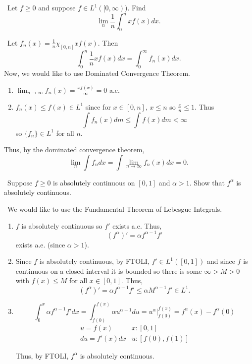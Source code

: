 \documentclass[12pt]{Homework}
\begin{document}
\begin{problem} $\,$
Let $f\ge0$ and suppose $f\in L^1([0,\infty))$. Find $$\lim_n\frac{1}{n}\int_0^nxf(x)dx.$$
\end{problem}


\begin{solution}$\,$
Let $f_n(x)=\frac{1}{n}\chi_{[0,n]}xf(x).$ Then $$\int_0^n\frac{1}{n}xf(x)dx=\int_0^\infty f_n(x)dx.$$
Now, we would like to use Dominated Convergence Theorem. 
\begin{enumerate}
    \item $\displaystyle\lim_{n\to\infty}f_n(x)=\frac{xf(x)}{\infty}=0$ a.e.
    \item $f_n(x)\le f(x)\in L^1$ since for $x\in[0,n]$, $x\le n$ so $\frac{x}{n}\le 1$. Thus $$\int f_n(x)dm\le\int f(x)dm<\infty$$ so $\{f_n\}\in L^1$ for all $n$.
\end{enumerate}

Thus, by the dominated convergence theorem, $$\lim_n\int f_ndx=\int\lim_{n\to\infty}f_n(x)dx=0.$$
\end{solution}
\newpage

\begin{problem} $\,$
Suppose $f\ge0$ is absolutely continuous on $[0,1]$ and $\alpha>1$. Show that $f^\alpha$ is absolutely continuous. 
\end{problem}


\begin{solution}$\,$
We would like to use the Fundamental Theorem of Lebesgue Integrals.
\begin{enumerate}
    \item $f$ is absolutely continuous so $f'$ exists a.e. Thus, $$(f^\alpha)'=\alpha f^{\alpha-1}f'$$ exists a.e. (since $\alpha>1$). 
    \item Since $f$ is absolutely continuous, by FTOLI, $f'\in L^1([0,1])$ and since $f$ is continuous on a closed interval it is bounded so there is some $\infty>M>0$ with $f(x)\le M$ for all $x\in[0,1]$. Thus, $$(f^\alpha)'=\alpha f^{\alpha-1}f'\le\alpha M^{\alpha-1}f'\in L^1.$$
    \item $$\int_0^x\alpha f^{\alpha-1}f'dx=\int_{f(0)}^{f(x)}\alpha u^{\alpha-1}du=u^\alpha\bigg|_{f(0)}^{f(x)}=f^\alpha(x)-f^\alpha(0)$$ $$\begin{matrix}
    u=f(x) & x:[0,1]  \\
    du=f'(x)dx & u:[f(0),f(1)]
\end{matrix}$$

Thus, by FTOLI, $f^\alpha$ is absolutely continuous.
\end{enumerate}

\end{solution}
\newpage
\end{document}
